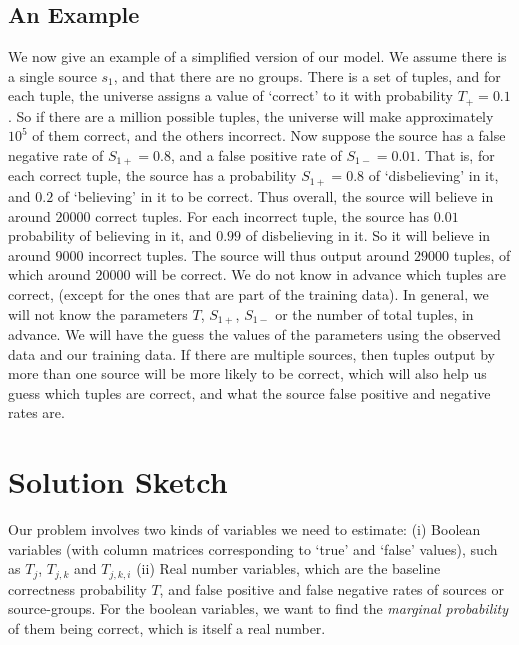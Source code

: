 \documentclass{sig-alternate}
\newcounter{prob}
\begin{document}
\subsection{An Example}\label{sec:causal-model-example}
We now give an example of a simplified version of our model. We assume there is a single source $s_1$, and that there are no groups. There is a set of tuples, and for each tuple, the universe assigns a value of `correct' to it with probability $T_{+}=0.1$. So if there are a million possible tuples, the universe will make approximately $10^5$ of them correct, and the others incorrect. Now suppose the source has a false negative rate of $S_{1+} = 0.8$, and a false positive rate of $S_{1-} = 0.01$. That is, for each correct tuple, the source has a probability $S_{1+} = 0.8$ of `disbelieving' in it, and $0.2$ of `believing' in it to be correct. Thus overall, the source will believe in around $20000$ correct tuples. For each incorrect tuple, the source has $0.01$ probability of believing in it, and $0.99$ of disbelieving in it. So it will believe in around $9000$ incorrect tuples. The source will thus output around $29000$ tuples, of which around $20000$ will be correct. We do not know in advance which tuples are correct, (except for the ones that are part of the training data). In general, we will not know the parameters $T$, $S_{1+}$, $S_{1-}$ or the number of total tuples, in advance. We will have the guess the values of the parameters using the observed data and our training data. If there are multiple sources, then tuples output by more than one source will be more likely to be correct, which will also help us guess which tuples are correct, and what the source false positive and negative rates are.

\section{Solution Sketch}
Our problem involves two kinds of variables we need to estimate: (i) Boolean variables (with column matrices corresponding to `true' and `false' values), such as $T_j$, $T_{j,k}$ and $T_{j,k,i}$ (ii) Real number variables, which are the baseline correctness probability $T$, and false positive and false negative rates of sources or source-groups. For the boolean variables, we want to find the \textit{marginal probability} of them being correct, which is itself a real number. 
\end{document}
